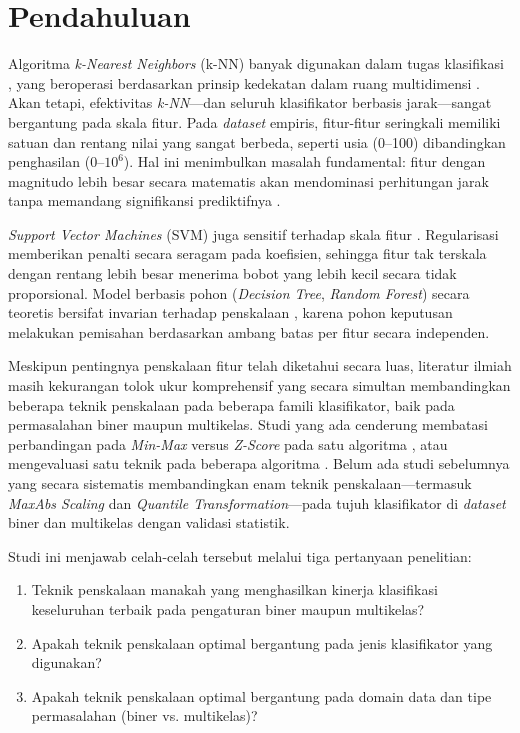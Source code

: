 \documentclass[12pt,a4paper]{article}
\begin{document}
\section{Pendahuluan}
\label{sec:intro}

Algoritma \textit{k-Nearest Neighbors} (k-NN) banyak digunakan dalam tugas
klasifikasi \cite{cunningham2021knn,halder2024knn}, yang beroperasi berdasarkan
prinsip kedekatan dalam ruang multidimensi \cite{bakri2025knn,sultana2022knn}.
Akan tetapi, efektivitas \textit{k-NN}---dan seluruh klasifikator berbasis
jarak---sangat bergantung pada skala fitur. Pada \textit{dataset} empiris,
fitur-fitur seringkali memiliki satuan dan rentang nilai yang sangat berbeda,
seperti usia (0--100) dibandingkan penghasilan ($0$--$10^6$). Hal ini menimbulkan
masalah fundamental: fitur dengan magnitudo lebih besar secara matematis akan
mendominasi perhitungan jarak tanpa memandang signifikansi prediktifnya
\cite{mutoffar2025ml,cetin2024distance,pagan2023scaling}.

\textit{Support Vector Machines} (SVM) juga sensitif terhadap skala fitur
\cite{guido2024svm,pinheiro2025scaling}. Regularisasi memberikan penalti secara
seragam pada koefisien, sehingga fitur tak terskala dengan rentang lebih besar
menerima bobot yang lebih kecil secara tidak proporsional. Model berbasis pohon
(\textit{Decision Tree}, \textit{Random Forest}) secara teoretis bersifat
invarian terhadap penskalaan \cite{ahsan2021scaling}, karena pohon keputusan
melakukan pemisahan berdasarkan ambang batas per fitur secara independen.

Meskipun pentingnya penskalaan fitur telah diketahui secara luas, literatur
ilmiah masih kekurangan tolok ukur komprehensif yang secara simultan
membandingkan beberapa teknik penskalaan pada beberapa famili klasifikator, baik
pada permasalahan biner maupun multikelas. Studi yang ada cenderung membatasi
perbandingan pada \textit{Min-Max} versus \textit{Z-Score} pada satu algoritma
\cite{henderi2021minmax,manurung2025knn}, atau mengevaluasi satu teknik pada
beberapa algoritma \cite{pagan2023scaling}. Belum ada studi sebelumnya yang
secara sistematis membandingkan enam teknik penskalaan---termasuk \textit{MaxAbs
Scaling} dan \textit{Quantile Transformation}---pada tujuh klasifikator di
\textit{dataset} biner dan multikelas dengan validasi statistik.

Studi ini menjawab celah-celah tersebut melalui tiga pertanyaan penelitian:

\begin{enumerate}
  \item[\textbf{RQ1:}] Teknik penskalaan manakah yang menghasilkan kinerja
  klasifikasi keseluruhan terbaik pada pengaturan biner maupun multikelas?
  \item[\textbf{RQ2:}] Apakah teknik penskalaan optimal bergantung pada jenis
  klasifikator yang digunakan?
  \item[\textbf{RQ3:}] Apakah teknik penskalaan optimal bergantung pada domain
  data dan tipe permasalahan (biner vs. multikelas)?
\end{enumerate}
\end{document}
